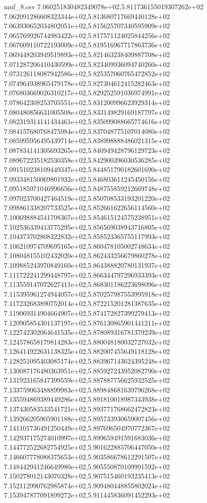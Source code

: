 \begin{filecontents*}{muf_8.csv}
7.060251830482349078e+02,5.811736155019307262e+02
7.062091286608323344e+02,5.813680717669440128e+02
7.063930652034802051e+02,5.815625707340595909e+02
7.065769926744983422e+02,5.817571124025844256e+02
7.067609110722193009e+02,5.819516967717863736e+02
7.069448203949519893e+02,5.821463238409887708e+02
7.071287206410430599e+02,5.823409936094740260e+02
7.073126118087942586e+02,5.825357060765472852e+02
7.074964938965479178e+02,5.827304612415282463e+02
7.076803669026310217e+02,5.829252591036974991e+02
7.078642308253705551e+02,5.831200996623929314e+02
7.080480856631005508e+02,5.833149829169187797e+02
7.082319314141434461e+02,5.835099088665774616e+02
7.084157680768475984e+02,5.837048775107014080e+02
7.085995956495439714e+02,5.838998888486021315e+02
7.087834141305693265e+02,5.840949428796129723e+02
7.089672235182530358e+02,5.842900396030536285e+02
7.091510238109449347e+02,5.844851790182601690e+02
7.093348150069801932e+02,5.846803611245450156e+02
7.095185971046996656e+02,5.848755859212669748e+02
7.097023700427464519e+02,5.850708533193201220e+02
7.098861338207733525e+02,5.852661622656114560e+02
7.100698884541708367e+02,5.854615124575238951e+02
7.102536339413775295e+02,5.856569038943716805e+02
7.104373702808322832e+02,5.858523365755117993e+02
7.106210974709695165e+02,5.860478105002748634e+02
7.108048155102432020e+02,5.862433256679860278e+02
7.109885243970849160e+02,5.864388820780131937e+02
7.111722241299448797e+02,5.866344797296933393e+02
7.113559147072627411e+02,5.868301186223698096e+02
7.115395961274944057e+02,5.870257987553995918e+02
7.117232683890752014e+02,5.872215201281387635e+02
7.119069314904664907e+02,5.874172827399279413e+02
7.120905854301137197e+02,5.876130865901441211e+02
7.122742302064641535e+02,5.878089316781379239e+02
7.124578658179814283e+02,5.880048180032727032e+02
7.126414922631138325e+02,5.882007455649118128e+02
7.128251095403085174e+02,5.883967143624395248e+02
7.130087176480363951e+02,5.885927243952082790e+02
7.131923165847399559e+02,5.887887756625932525e+02
7.133759063488899983e+02,5.889848681639796268e+02
7.135594869389449286e+02,5.891810018987343938e+02
7.137430583533541721e+02,5.893771768662472823e+02
7.139266205905901188e+02,5.895733930659007456e+02
7.141101736491250449e+02,5.897696504970772367e+02
7.142937175274010997e+02,5.899659491591683036e+02
7.144772522682754925e+02,5.901622885706447050e+02
7.146607778088375653e+02,5.903586678612291507e+02
7.148442941246649980e+02,5.905550870109991592e+02
7.150278012143070328e+02,5.907515460193235413e+02
7.152112990762985874e+02,5.909480448855802024e+02
7.153947877091899272e+02,5.911445836091452293e+02

\end{filecontents*}
